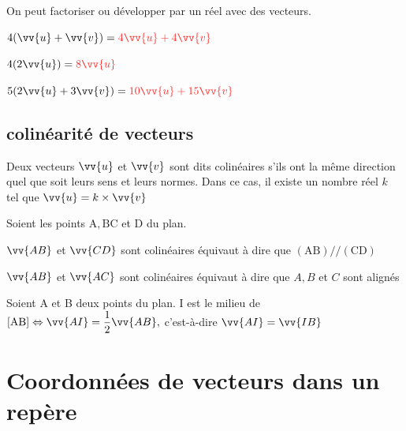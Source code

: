\documentclass[11pt,a4paper]{article}  %
\begin{document}
\begin{bprop}
	On peut factoriser ou développer par un réel avec des vecteurs.
\end{bprop}

\begin{bexemples}
	\begin{enumEx}
		\item $4(\vv{u}+\vv{v})=\mRougeWB{4\vv{u}+4\vv{v}}$
		\item $4(2 \vv{u})=\mRougeWB{8\vv{u}}$
		\item $5(2 \vv{u}+3 \vv{v})=\mRougeWB{10\vv{u}+15\vv{v}}$
	\end{enumEx}
\end{bexemples}


\subsection{colinéarité de vecteurs}

\begin{bdefi}
	 Deux vecteurs $\vv{u}$ et $\vv{v}$ sont dits colinéaires s'ils ont la même direction quel que soit leurs sens et leurs normes. Dans ce cas, il existe un nombre réel $k$ tel que $\vv{u}=k \times \vv{v}$
\end{bdefi}

\begin{bprop}
	 Soient les points $\mathrm{A}, \mathrm{B} \mathrm{C}$ et $\mathrm{D}$ du plan.
	\begin{itemDef}
		\item $\vv{A B}$ et $\vv{C D}$ sont colinéaires équivaut à dire que $(\mathrm{AB}) / /(\mathrm{CD})$
		\item $\vv{A B}$ et $\vv{A C}$ sont colinéaires équivaut à dire que $A, B$ et $C$ sont alignés
	\end{itemDef}
\end{bprop}

\begin{bprop}
	 Soient A et B deux points du plan. I est le milieu de $[\mathrm{AB}] \Leftrightarrow \vv{A I}=\dfrac{1}{2} \vv{A B},$ c'est-à-dire $\vv{A I}=\vv{I B}$
\end{bprop}

\section{Coordonnées de vecteurs dans un repère}
\end{document}
